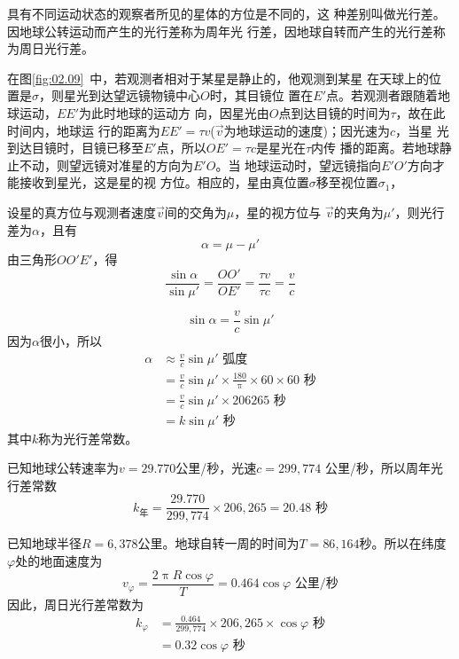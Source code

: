具有不同运动状态的观察者所见的星体的方位是不同的，这
种差别叫做光行差。因地球公转运动而产生的光行差称为周年光
行差，因地球自转而产生的光行差称为周日光行差。

在图\ref{fig:02.09}~中，若观测者相对于某星是静止的，他观测到某星
在天球上的位置是$\sigma$，则星光到达望远镜物镜中心$O$时，其目镜位
置在$E'$点。若观测者跟随着地球运动，$EE'$为此时地球的运动方
向，因星光由$O$点到达目镜的时间为$\tau$，故在此时间内，地球运
行的距离为$EE'=\tau v$($\vec{v}$为地球运动的速度)；因光速为$c$，当星
光到达目镜时，目镜已移至$E'$点，所以$OE'=\tau c$是星光在$\tau$内传
播的距离。若地球静止不动，则望远镜对准星的方向为$E'O$。当
地球运动时，望远镜指向$E'O'$方向才能接收到星光，这是星的视
方位。相应的，星由真位置$\sigma$移至视位置$\sigma_1$，

设星的真方位与观测者速度$\vec{v}$间的交角为$\mu$，星的视方位与
$\vec{v}$的夹角为$\mu'$，则光行差为$\alpha$，且有
\begin{equation*}
  \alpha=\mu-\mu'
\end{equation*}
由三角形$OO'E'$，得
\begin{equation*}
  \frac{\sin\alpha}{\sin\mu'}=\frac{OO'}{OE'}=\frac{\tau v}{\tau c}=\frac{v}{c}
\end{equation*}

\clearpage
\begin{equation*}
  \sin\alpha=\frac{v}{c}\sin\mu'
\end{equation*}
因为$\alpha$很小，所以
\begin{align*}
  \alpha & \approx\frac{v}{c}\sin\mu'\text{ 弧度}                                     \\
         & =\frac{v}{c}\sin\mu'\times\frac{180}{\uppi}\times 60 \times 60 \text{ 秒} \\
         & =\frac{v}{c}\sin\mu'\times 206265\text{ 秒}                               \\
         & =k\sin\mu'\text{ 秒}
\end{align*}
其中$k$称为光行差常数。

已知地球公转速率为$v=29.770$公里/秒，光速$c=299,774$
公里/秒，所以周年光行差常数
\begin{equation*}
  k_\text{年}=\frac{29.770}{299,774}\times 206,265=20.48\text{ 秒}
\end{equation*}

已知地球半径$R=6,378$公里。地球自转一周的时间为$T=
  86,164$秒。所以在纬度$\varphi$处的地面速度为
\begin{equation*}
  v_\varphi=\frac{2\uppi R\cos\varphi}{T}=0.464\cos\varphi\text{ 公里/秒}
\end{equation*}
因此，周日光行差常数为
\begin{align*}
  k_\varphi & =\frac{0.464}{299,774}\times 206,265\times\cos\varphi\text{ 秒} \\
            & =0.32\cos\varphi\text{ 秒}
\end{align*}

